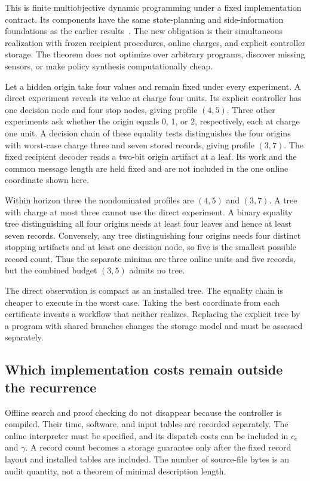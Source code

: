 This is finite multiobjective dynamic programming under a fixed implementation contract. Its components have the same state-planning and side-information foundations as the earlier results~\cite{MU:smallwood,MU:witsenhausen,MU:alon}. The new obligation is their simultaneous realization with frozen recipient procedures, online charges, and explicit controller storage. The theorem does not optimize over arbitrary programs, discover missing sensors, or make policy synthesis computationally cheap.

\begin{MUcounterexample}\label{MU:ex:resource-frontier}
Let a hidden origin take four values and remain fixed under every experiment. A direct experiment reveals its value at charge four units. Its explicit controller has one decision node and four stop nodes, giving profile $(4,5)$. Three other experiments ask whether the origin equals 0, 1, or 2, respectively, each at charge one unit. A decision chain of these equality tests distinguishes the four origins with worst-case charge three and seven stored records, giving profile $(3,7)$. The fixed recipient decoder reads a two-bit origin artifact at a leaf. Its work and the common message length are held fixed and are not included in the one online coordinate shown here.

Within horizon three the nondominated profiles are $(4,5)$ and $(3,7)$. A tree with charge at most three cannot use the direct experiment. A binary equality tree distinguishing all four origins needs at least four leaves and hence at least seven records. Conversely, any tree distinguishing four origins needs four distinct stopping artifacts and at least one decision node, so five is the smallest possible record count. Thus the separate minima are three online units and five records, but the combined budget $(3,5)$ admits no tree.
\end{MUcounterexample}

The direct observation is compact as an installed tree. The equality chain is cheaper to execute in the worst case. Taking the best coordinate from each certificate invents a workflow that neither realizes. Replacing the explicit tree by a program with shared branches changes the storage model and must be assessed separately.

\subsection{Which implementation costs remain outside the recurrence}
Offline search and proof checking do not disappear because the controller is compiled. Their time, software, and input tables are recorded separately. The online interpreter must be specified, and its dispatch costs can be included in $c_e$ and $\gamma$. A record count becomes a storage guarantee only after the fixed record layout and installed tables are included. The number of source-file bytes is an audit quantity, not a theorem of minimal description length.

